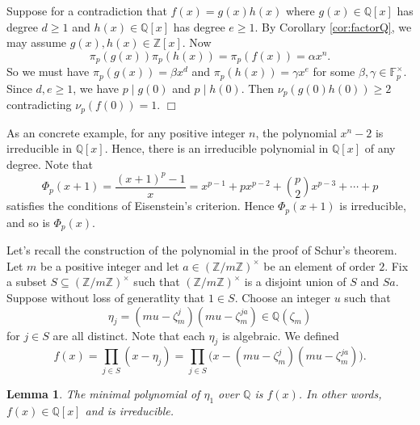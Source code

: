 \documentclass{article}
\def\Z{{\mathbb Z}}
\def\F{{\mathbb F}}
\def\Q{{\mathbb Q}}
\def\Z{{\mathbb Z}}
\def\F{{\mathbb F}}
\def\Q{{\mathbb Q}}
\newtheorem{lemma}[subsection]{Lemma}
\newenvironment{proof}{\noindent {\bf Proof:}}{$\Box$ \vspace{2 ex}}
\begin{document}
\begin{proof}
    Suppose for a contradiction that $f(x) = g(x)h(x)$ where $g(x)\in\Q[x]$ has degree $d\geq1$ and $h(x)\in\Q[x]$ has degree $e\geq1$. By Corollary \ref{cor:factorQ}, we may assume $g(x),h(x)\in\Z[x]$. Now $$\pi_p(g(x))\pi_p(h(x)) = \pi_p(f(x)) = \alpha x^n.$$ So we must have $\pi_p(g(x)) = \beta x^d$ and $\pi_p(h(x)) = \gamma x^e$ for some $\beta,\gamma\in \F_p^\times$. Since $d,e\geq 1$, we have $p\mid g(0)$ and $p\mid h(0)$. Then $\nu_p(g(0)h(0))\geq 2$ contradicting $\nu_p(f(0)) = 1$.
\end{proof}

As an concrete example, for any positive integer $n$, the polynomial $x^n - 2$ is irreducible in $\Q[x]$. Hence, there is an irreducible polynomial in $\Q[x]$ of any degree. Note that $$\Phi_p(x+1) = \frac{(x+1)^p - 1}{x} = x^{p-1} + px^{p-2} + \binom{p}{2}x^{p-3} + \cdots + p$$
satisfies the conditions of Eisenstein's criterion. Hence $\Phi_p(x+1)$ is irreducible, and so is $\Phi_p(x)$.


Let's recall the construction of the polynomial in the proof of Schur's theorem. Let $m$ be a positive integer and let $a\in(\Z/m\Z)^\times$ be an element of order $2$. Fix a subset $S\subseteq (\Z/m\Z)^\times$ such that $(\Z/m\Z)^\times$ is a disjoint union of $S$ and $Sa$. Suppose without loss of generatlity that $1\in S$. Choose an integer $u$ such that
$$\eta_j = (mu - \zeta_m^j)(mu - \zeta_m^{ja})\in\Q(\zeta_m)$$
for $j\in S$ are all distinct. Note that each $\eta_j$ is algebraic.  We defined
$$f(x) = \prod_{j\in S}(x - \eta_j) = \prod_{j\in S}\Big(x - (mu - \zeta_m^j)(mu - \zeta_m^{ja})\Big).$$
\begin{lemma}
    The minimal polynomial of $\eta_1$ over $\Q$ is $f(x)$. In other words, $f(x)\in\Q[x]$ and is irreducible.
\end{lemma}
\end{document}
